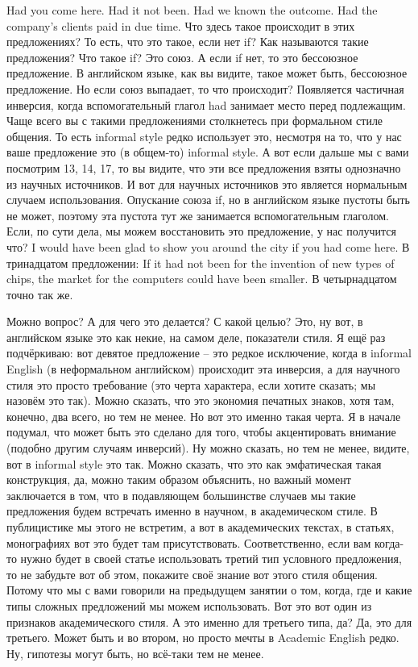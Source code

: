 \documentclass[main.tex]{subfiles}
\begin{document}
Had you come here. Had it not been. Had we known the outcome. Had the company's clients paid in due time.
Что здесь такое происходит в этих предложениях?
То есть, что это такое, если нет if?
Как называются такие предложения?
Что такое if?
Это союз.
А если if нет, то это бессоюзное предложение.
В английском языке, как вы видите, такое может быть, бессоюзное предложение.
Но если союз выпадает, то что происходит?
Появляется частичная инверсия, когда вспомогательный глагол had занимает место перед подлежащим.
Чаще всего вы с такими предложениями столкнетесь при формальном стиле общения.
То есть informal style редко использует это, несмотря на то, что у нас ваше предложение это (в общем-то) informal style.
А вот если дальше мы с вами посмотрим 13, 14, 17, то вы видите, что эти все предложения взяты однозначно из научных источников.
И вот для научных источников это является нормальным случаем использования.
Опускание союза if, но в английском языке пустоты быть не может, поэтому эта пустота тут же занимается вспомогательным глаголом.
Если, по сути дела, мы можем восстановить это предложение, у нас получится что?
I would have been glad to show you around the city if you had come here.
В тринадцатом предложении: If it had not been for the invention of new types of chips, the market for the computers could have been smaller.
В четырнадцатом точно так же.

Можно вопрос?
А для чего это делается?
С какой целью?
Это, ну вот, в английском языке это как некие, на самом деле, показатели стиля.
Я ещё раз подчёркиваю: вот девятое предложение -- это редкое исключение, когда в informal English (в неформальном английском) происходит эта инверсия, а для научного стиля это просто требование (это черта характера, если хотите сказать; мы назовём это так).
Можно сказать, что это экономия печатных знаков, хотя там, конечно, два всего, но тем не менее.
Но вот это именно такая черта.
Я в начале подумал, что может быть это сделано для того, чтобы акцентировать внимание (подобно другим случаям инверсий).
Ну можно сказать, но тем не менее, видите, вот в informal style это так.
Можно сказать, что это как эмфатическая такая конструкция, да, можно таким образом объяснить, но важный момент заключается в том, что в подавляющем большинстве случаев мы такие предложения будем встречать именно в научном, в академическом стиле.
В публицистике мы этого не встретим, а вот в академических текстах, в статьях, монографиях вот это будет там присутствовать.
Соответственно, если вам когда-то нужно будет в своей статье использовать третий тип условного предложения, то не забудьте вот об этом, покажите своё знание вот этого стиля общения.
Потому что мы с вами говорили на предыдущем занятии о том, когда, где и какие типы сложных предложений мы можем использовать.
Вот это вот один из признаков академического стиля.
А это именно для третьего типа, да?
Да, это для третьего.
Может быть и во втором, но просто мечты в Academic English редко.
Ну, гипотезы могут быть, но всё-таки тем не менее.
\end{document}
